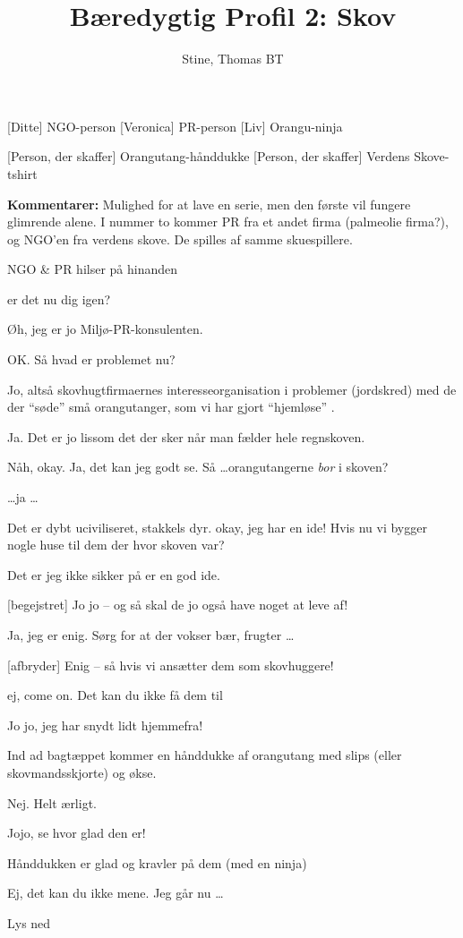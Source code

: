 \documentclass[a4paper,11pt]{article}
\title{Bæredygtig Profil 2: Skov}
\author{Stine, Thomas BT}
\begin{document}
\maketitle

\begin{roles}
    [Ditte] NGO-person
    [Veronica] PR-person
    [Liv] Orangu-ninja
\end{roles}

\begin{props}
    [Person, der skaffer] Orangutang-hånddukke
    [Person, der skaffer] Verdens Skove-tshirt
\end{props}

\begin{sketch}

\textbf{Kommentarer:} Mulighed for at lave en serie, men den første vil fungere glimrende alene. 
I nummer to kommer PR fra et andet firma (palmeolie firma?), og NGO’en fra verdens skove. De spilles af samme skuespillere. 

\scene NGO \& PR hilser på hinanden


 er det nu dig igen? 


 Øh, jeg er jo Miljø-PR-konsulenten. 


 OK. Så hvad er problemet nu?


 Jo, altså skovhugtfirmaernes interesseorganisation i problemer (jordskred) med de der ``søde'' små orangutanger, som vi har gjort “hjemløse” .


 Ja. Det er jo lissom det der sker når man fælder hele regnskoven. 


 Nåh, okay. Ja, det kan jeg godt se. Så \ldots orangutangerne \emph{bor} i skoven?


 \dots ja \ldots


 Det er dybt uciviliseret, stakkels dyr. 
 okay, jeg har en ide! Hvis nu vi bygger nogle huse til dem der hvor skoven var?


 Det er jeg ikke sikker på er en god ide.


[begejstret] Jo jo -- og så skal de jo også have noget at leve af!


 Ja, jeg er enig. Sørg for at der vokser bær, frugter \ldots


[afbryder] Enig -- så hvis vi ansætter dem som skovhuggere! 


 ej, come on. Det kan du ikke få dem til


 Jo jo, jeg har snydt lidt hjemmefra! 


\scene Ind ad bagtæppet kommer en hånddukke af orangutang med slips (eller skovmandsskjorte) og økse. 


 Nej. Helt ærligt. 


 Jojo, se hvor glad den er!


\scene Hånddukken er glad og kravler på dem (med en ninja)


 Ej, det kan du ikke mene. Jeg går nu \ldots


\scene Lys ned
\end{sketch}
\end{document}
